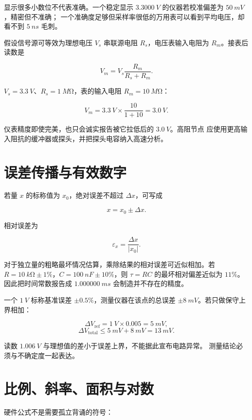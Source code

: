 显示很多小数位不代表准确。一个稳定显示
\(\SI{3.3000}{V}\) 的仪器若校准偏差为 \(\SI{50}{mV}\)，精密但不准确；
一个准确度足够但采样率很低的万用表可以看到平均电压，却看不到
\(\SI{5}{ns}\) 毛刺。

假设信号源可等效为理想电压 \(V_s\) 串联源电阻 \(R_s\)，电压表输入电阻为
\(R_m\)。接表后读数是

\[
V_m=V_s\frac{R_m}{R_s+R_m}.
\]

\begin{workedexample}
\(V_s=\SI{3.3}{V}\)、\(R_s=\SI{1}{M\ohm}\)，表的输入电阻
\(R_m=\SI{10}{M\ohm}\)：

\[
V_m=\SI{3.3}{V}\times\frac{10}{1+10}
=\SI{3.0}{V}.
\]

仪表精度即使完美，也只会诚实报告被它拉低后的 \(\SI{3.0}{V}\)。高阻节点
应使用更高输入阻抗的缓冲器或探头，并把探头电容纳入高速分析。
\end{workedexample}

\section{误差传播与有效数字}
若量 \(x\) 的标称值为 \(x_0\)，绝对误差不超过 \(\Delta x\)，可写成

\[
x=x_0\pm\Delta x.
\]

相对误差为

\[
\varepsilon_x=\frac{\Delta x}{|x_0|}.
\]

对于独立量的粗略最坏情况估算，乘除结果的相对误差可近似相加。若
\(R=\SI{10}{k\ohm}\pm1\%\)，\(C=\SI{100}{nF}\pm10\%\)，则
\(\tau=RC\) 的最坏相对偏差近似为 \(11\%\)。因此把时间常数报告成
\(\SI{1.000000}{ms}\) 会制造并不存在的精度。

\begin{workedexample}
一个 \(\SI{1}{V}\) 标称基准误差 \(\pm0.5\%\)，测量仪器在该点的总误差
\(\pm\SI{8}{mV}\)。若只做保守上界相加：

\[
\Delta V_{\mathrm{ref}}=\SI{1}{V}\times0.005=\SI{5}{mV},
\]
\[
\Delta V_{\mathrm{total}}\le\SI{5}{mV}+\SI{8}{mV}
=\SI{13}{mV}.
\]

读数 \(\SI{1.006}{V}\) 与理想值的差小于误差上界，不能据此宣布电路异常。
测量结论必须与不确定度一起表达。
\end{workedexample}

\section{比例、斜率、面积与对数}
硬件公式不是需要孤立背诵的符号：

